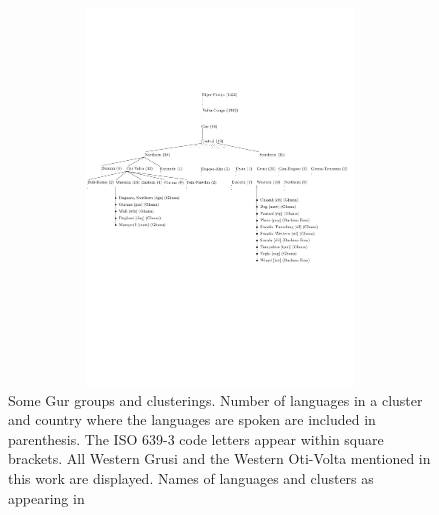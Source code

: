  \begin{figure}
 \centering
 \includegraphics[width=15cm,height=10cm]{Graphic/Pictures/Gur-tree.pdf}
  \caption[Gur groups and clusterings]{Some Gur groups and clusterings.
Number of languages in a cluster and country where the languages are
spoken are included in
parenthesis. The ISO 639-3 code letters appear within square brackets.
All Western Grusi and the Western Oti-Volta mentioned in this work are
displayed. Names of languages and clusters as appearing  in 
\cite{Lewi09}
\label{fig:Gur-tree}}
\end{figure}

\newpage



